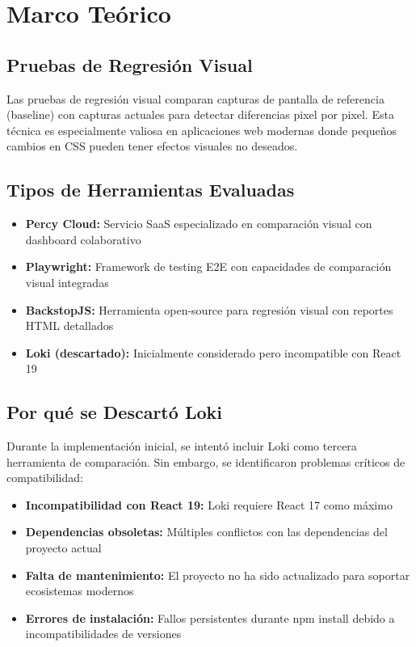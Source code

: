 \documentclass{article}
\begin{document}
\section{Marco Teórico}

\subsection{Pruebas de Regresión Visual}
Las pruebas de regresión visual comparan capturas de pantalla de referencia (baseline) con capturas actuales para detectar diferencias pixel por pixel. Esta técnica es especialmente valiosa en aplicaciones web modernas donde pequeños cambios en CSS pueden tener efectos visuales no deseados.

\subsection{Tipos de Herramientas Evaluadas}
\begin{itemize}[nosep]
\item \textbf{Percy Cloud:} Servicio SaaS especializado en comparación visual con dashboard colaborativo
\item \textbf{Playwright:} Framework de testing E2E con capacidades de comparación visual integradas
\item \textbf{BackstopJS:} Herramienta open-source para regresión visual con reportes HTML detallados
\item \textbf{Loki (descartado):} Inicialmente considerado pero incompatible con React 19
\end{itemize}

\subsection{Por qué se Descartó Loki}
Durante la implementación inicial, se intentó incluir Loki como tercera herramienta de comparación. Sin embargo, se identificaron problemas críticos de compatibilidad:

\begin{itemize}[nosep]
\item \textbf{Incompatibilidad con React 19:} Loki requiere React 17 como máximo
\item \textbf{Dependencias obsoletas:} Múltiples conflictos con las dependencias del proyecto actual
\item \textbf{Falta de mantenimiento:} El proyecto no ha sido actualizado para soportar ecosistemas modernos
\item \textbf{Errores de instalación:} Fallos persistentes durante npm install debido a incompatibilidades de versiones
\end{itemize}
\end{document}
